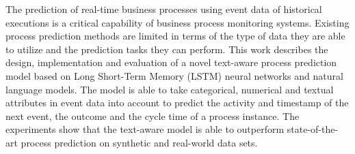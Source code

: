 The prediction of real-time business processes using event data of historical executions is a critical capability of business process monitoring systems.
Existing process prediction methods are limited in terms of the type of data they are able to utilize and the prediction tasks they can perform.
This work describes the design, implementation and evaluation of a novel text-aware process prediction model based on Long Short-Term Memory (LSTM) neural networks and natural language models.
The model is able to take categorical, numerical and textual attributes in event data into account to predict the activity and timestamp of the next event, the outcome and the cycle time of a process instance.
The experiments show that the text-aware model is able to outperform state-of-the-art process prediction on synthetic and real-world data sets.